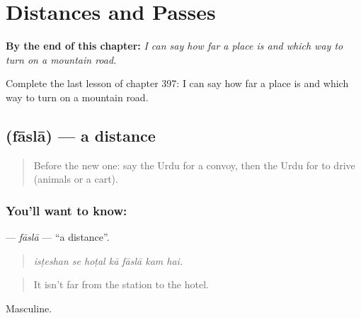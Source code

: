 
\chapter{Distances and Passes}
\label{ch:ur-distances-and-passes}

\begin{chapteropening}
\textbf{By the end of this chapter:} \emph{I can say how far a place is and which way to turn on a mountain road.}

Complete the last lesson of chapter 397: I can say how far a place is and which way to turn on a mountain road.
\end{chapteropening}

\section[\texorpdfstring{\ur{فاصلہ} (fāslā)}{فاصلہ (fāslā)}]{ (fāslā) — a distance}

\label{lesson:UR-C397-fasla}



\begin{quote}
Before the new one: say the Urdu for a convoy, then the Urdu for to drive (animals or a cart).
\end{quote}

\subsection*{You'll want to know: }
\textbf{} — \emph{fāslā} — \textquotedblleft{}a distance\textquotedblright{}.

\begin{quote}
      
\end{quote}

\begin{quote}
\emph{isṭeshan se hoṭal kā fāslā kam hai.}
\end{quote}

\begin{quote}
It isn't far from the station to the hotel.
\end{quote}

Masculine.

